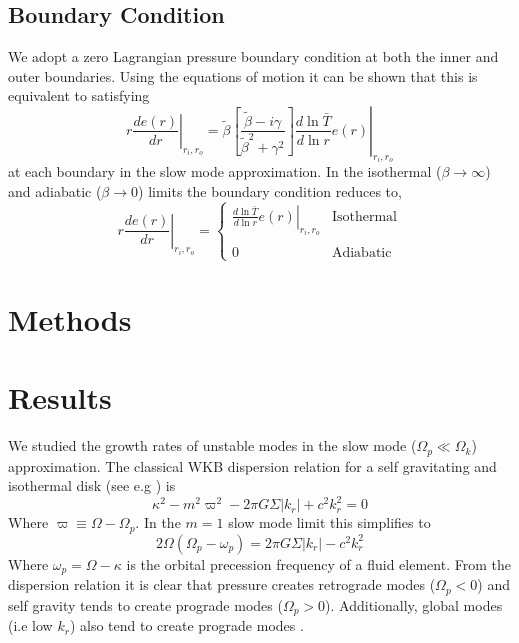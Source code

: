 \documentclass[apj]{emulateapj}
\begin{document}
\subsection{Boundary Condition} 
We adopt a zero Lagrangian pressure boundary condition at both the inner and outer boundaries. Using the equations of motion it can be shown that this is equivalent to satisfying 
\begin{equation}
\left. r \frac{d e(r) }{d r}\right|_{r_i, r_o} = \left. \tilde{\beta} \left[ \frac{ \tilde{\beta} - i \gamma }{ \tilde{\beta}^2 + \gamma^2 } \right] \frac{d \ln \bar{T}}{d \ln r } e(r) \right|_{r_i, r_o}
\end{equation}
at each boundary in the slow mode approximation. In the isothermal ($\beta \rightarrow \infty$) and adiabatic ($\beta \rightarrow 0$) limits the boundary condition reduces to,
\begin{equation}
\left. r \frac{d e(r)}{d r} \right|_{r_i, r_o} = 
\begin{cases}
\left. \frac{d \ln \bar{T}}{d \ln r} e(r) \right|_{r_i,r_o}  & \text{Isothermal} \\ \\ 
0 & \text{Adiabatic}
\end{cases}
\end{equation}


\section{Methods}


\section{Results}
We studied the growth rates of unstable modes in the slow mode ($\Omega_p \ll \Omega_k$) approximation. The classical WKB dispersion relation for a self gravitating and isothermal disk (see e.g \citet{bt2}) is
\begin{equation}
 \kappa^2  - m^2 \varpi^2 - 2 \pi G \Sigma |k_r| + c^2 k_r^2  = 0
\end{equation}
Where $\varpi \equiv \Omega - \Omega_p$. In the $m=1$ slow mode limit this simplifies to \citep{papa02}
\begin{equation}
2 \Omega ( \Omega_p - \omega_p) =  2 \pi G \Sigma |k_r| - c^2 k_r^2 
\end{equation}
Where $\omega_p = \Omega - \kappa$ is the orbital precession frequency of a fluid element. From the dispersion relation it is clear that pressure creates retrograde modes ($\Omega_p < 0$) and self gravity tends to create prograde modes ($\Omega_p > 0$). Additionally, global modes (i.e low $k_r$) also tend to create prograde modes \citep{papa02}. 
\end{document}
